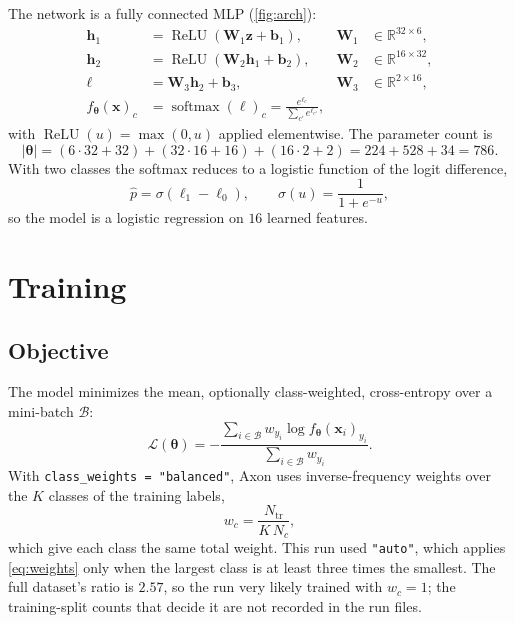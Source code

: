 \documentclass[11pt]{article}
\newcommand{\R}{\mathbb{R}}
\newcommand{\relu}{\operatorname{ReLU}}
\newcommand{\softmax}{\operatorname{softmax}}
\newcommand{\code}[1]{\texttt{#1}}
\begin{document}
The network is a fully connected MLP (\cref{fig:arch}):
\begin{align}
  \bm{h}_1 &= \relu(\bm{W}_1 \bm{z} + \bm{b}_1), & \bm{W}_1 &\in \R^{32\times 6}, \\
  \bm{h}_2 &= \relu(\bm{W}_2 \bm{h}_1 + \bm{b}_2), & \bm{W}_2 &\in \R^{16\times 32}, \\
  \bm{\ell} &= \bm{W}_3 \bm{h}_2 + \bm{b}_3, & \bm{W}_3 &\in \R^{2\times 16}, \\
  f_{\bm\theta}(\bm{x})_c &= \softmax(\bm{\ell})_c = \frac{e^{\ell_c}}{\sum_{c'} e^{\ell_{c'}}},
\end{align}
with $\relu(u) = \max(0, u)$ applied elementwise. The parameter count is
\begin{equation}
  |\bm\theta| = (6\cdot 32 + 32) + (32\cdot 16 + 16) + (16 \cdot 2 + 2) = 224 + 528 + 34 = 786.
\end{equation}
With two classes the softmax reduces to a logistic function of the logit
difference,
\begin{equation}\label{eq:logistic}
  \hat{p} = \sigma(\ell_1 - \ell_0), \qquad \sigma(u) = \frac{1}{1+e^{-u}},
\end{equation}
so the model is a logistic regression on $16$ learned features.

\section{Training}\label{sec:training}

\subsection{Objective}

The model minimizes the mean, optionally class-weighted, cross-entropy over a
mini-batch $\mathcal{B}$:
\begin{equation}
  \mathcal{L}(\bm\theta) = -\frac{\sum_{i\in\mathcal{B}} w_{y_i} \log f_{\bm\theta}(\bm{x}_i)_{y_i}}{\sum_{i\in\mathcal{B}} w_{y_i}}.
\end{equation}
With \code{class\_weights = "balanced"}, Axon uses inverse-frequency weights over
the $K$ classes of the training labels,
\begin{equation}\label{eq:weights}
  w_c = \frac{N_{\text{tr}}}{K \, N_c},
\end{equation}
which give each class the same total weight. This run used \code{"auto"}, which
applies \cref{eq:weights} only when the largest class is at least three times
the smallest. The full dataset's ratio is $2.57$, so the run very likely trained
with $w_c = 1$; the training-split counts that decide it are not recorded in the
run files.
\end{document}
